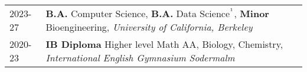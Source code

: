 

\renewcommand{\thefootnote}{\fnsymbol{footnote}}
\setcounter{footnote}{0}

\begin{longtable}[l]{@{}p{} p{}}

    2023-27 & \textbf{B.A.} Computer Science, \textbf{B.A.} Data Science$^{\text{\footnotemark}}$, \textbf{Minor} Bioengineering, \textit{University of California, Berkeley} \\


    2020-23 & \textbf{IB Diploma} Higher level Math AA, Biology, Chemistry, \textit{International English Gymnasium Sodermalm} \\
\end{longtable}



\renewcommand{\thefootnote}{\arabic{footnote}}
\setcounter{footnote}{1}
